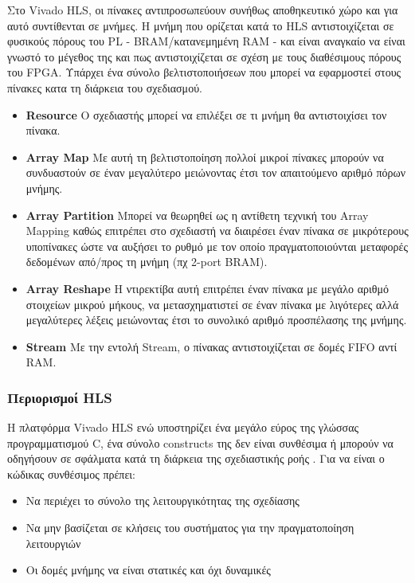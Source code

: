 \begin{itemize}[label={},leftmargin=*]
Στο Vivado HLS, οι πίνακες αντιπροσωπεύουν συνήθως αποθηκευτικό χώρο και για αυτό συντίθενται σε μνήμες. H μνήμη που ορίζεται κατά το HLS αντιστοιχίζεται σε φυσικούς πόρους του PL - BRAM/κατανεμημένη RAM - και είναι αναγκαίο να είναι γνωστό το μέγεθος της και πως αντιστοιχίζεται σε σχέση με τους διαθέσιμους πόρους του FPGA. Υπάρχει ένα σύνολο βελτιστοποιήσεων που μπορεί να εφαρμοστεί στους πίνακες κατα τη διάρκεια του σχεδιασμού.
\begin{itemize}
		\item \textbf{Resource}
		Ο σχεδιαστής μπορεί να επιλέξει σε τι μνήμη θα αντιστοιχίσει τον πίνακα.
		\item \textbf{Array Map}
		Με αυτή τη βελτιστοποίηση πολλοί μικροί πίνακες μπορούν να συνδυαστούν σε έναν μεγαλύτερο μειώνοντας έτσι τον απαιτούμενο αριθμό πόρων μνήμης.
		\item \textbf{Array Partition}
		Μπορεί να θεωρηθεί ως η αντίθετη τεχνική του Array Mapping καθώς επιτρέπει στο σχεδιαστή να διαιρέσει έναν πίνακα σε μικρότερους υποπίνακες ώστε να αυξήσει το ρυθμό με τον οποίο πραγματοποιούνται μεταφορές δεδομένων από/προς τη μνήμη (πχ 2-port BRAM).
		\item \textbf{Array Reshape}
		Η ντιρεκτίβα αυτή επιτρέπει έναν πίνακα με μεγάλο αριθμό στοιχείων μικρού μήκους, να μετασχηματιστεί σε έναν πίνακα με λιγότερες αλλά μεγαλύτερες λέξεις μειώνοντας έτσι το συνολικό αριθμό προσπέλασης της μνήμης.
		\item \textbf{Stream}
		Με την εντολή Stream, ο πίνακας αντιστοιχίζεται σε δομές FIFO αντί RAM.
	\end{itemize}
\end{itemize}
\subsubsection{Περιορισμοί HLS}

Η πλατφόρμα Vivado HLS ενώ υποστηρίζει ένα μεγάλο εύρος της γλώσσας προγραμματισμού C, ένα σύνολο constructs της δεν είναι συνθέσιμα ή μπορούν να οδηγήσουν σε σφάλματα κατά τη διάρκεια της σχεδιαστικής ροής \cite{ug902}. Για να είναι ο κώδικας συνθέσιμος πρέπει:
\begin{itemize}
	\item{Να περιέχει το σύνολο της λειτουργικότητας της σχεδίασης}
	\item{Να μην βασίζεται σε κλήσεις του συστήματος για την πραγματοποίηση λειτουργιών}
	\item{Οι δομές μνήμης να είναι στατικές και όχι δυναμικές} \\
\end{itemize}

